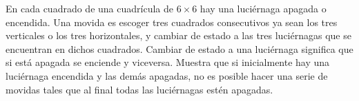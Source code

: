 En cada cuadrado de una cuadrícula de $6 \times 6$ hay una luciérnaga apagada o encendida.
Una movida es escoger tres cuadrados consecutivos ya sean los tres verticales o los tres
horizontales, y cambiar de estado a las tres luciérnagas que se encuentran en dichos
cuadrados. Cambiar de estado a una luciérnaga significa que si está apagada se enciende
y viceversa.
Muestra que si inicialmente hay una luciérnaga encendida y las demás apagadas, no es
posible hacer una serie de movidas tales que al final todas las luciérnagas estén apagadas.
